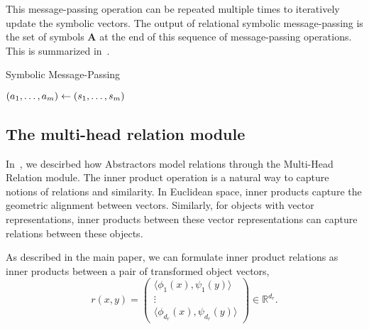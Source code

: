 This message-passing operation can be repeated multiple times to iteratively update the symbolic vectors.  The output of relational symbolic message-passing is the set of symbols $\bm{A}$ at the end of this sequence of message-passing operations. This is summarized in~.

\begin{algorithm}[ht!]
	\caption{Symbolic Message-Passing}\label{alg:symbolic_mp}

	\vspace{1em}

	\((a_1, \ldots, a_m) \gets (s_1, \ldots, s_m)\)

\end{algorithm}

\subsection{The multi-head relation module}

In~, we descirbed how Abstractors model relations through the Multi-Head Relation module. The inner product operation is a natural way to capture notions of relations and similarity. In Euclidean space, inner products capture the geometric alignment between vectors. Similarly, for objects with vector representations, inner products between these vector representations can capture relations between these objects.

As described in the main paper, we can formulate inner product relations as inner products between a pair of transformed object vectors,
\begin{equation}\label{eq:inner_prod_rel_supp}
    r(x,y) = \begin{pmatrix}\langle \phi_1(x), \psi_1(y) \rangle \\ \vdots \\ \langle \phi_{d_r}(x), \psi_{d_r}(y) \rangle \end{pmatrix} \in \mathbb{R}^{d_r}.
\end{equation}

